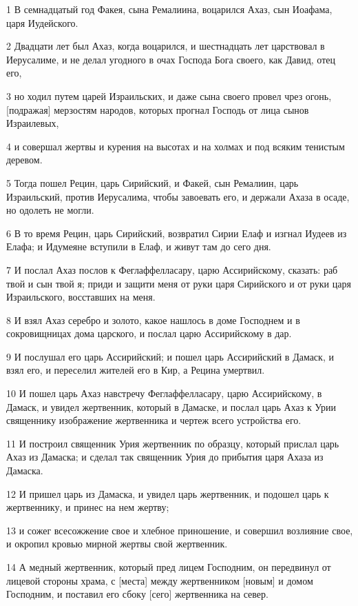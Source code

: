 \par 1 В семнадцатый год Факея, сына Ремалиина, воцарился Ахаз, сын Иоафама, царя Иудейского.
\par 2 Двадцати лет был Ахаз, когда воцарился, и шестнадцать лет царствовал в Иерусалиме, и не делал угодного в очах Господа Бога своего, как Давид, отец его,
\par 3 но ходил путем царей Израильских, и даже сына своего провел чрез огонь, [подражая] мерзостям народов, которых прогнал Господь от лица сынов Израилевых,
\par 4 и совершал жертвы и курения на высотах и на холмах и под всяким тенистым деревом.
\par 5 Тогда пошел Рецин, царь Сирийский, и Факей, сын Ремалиин, царь Израильский, против Иерусалима, чтобы завоевать его, и держали Ахаза в осаде, но одолеть не могли.
\par 6 В то время Рецин, царь Сирийский, возвратил Сирии Елаф и изгнал Иудеев из Елафа; и Идумеяне вступили в Елаф, и живут там до сего дня.
\par 7 И послал Ахаз послов к Феглаффелласару, царю Ассирийскому, сказать: раб твой и сын твой я; приди и защити меня от руки царя Сирийского и от руки царя Израильского, восставших на меня.
\par 8 И взял Ахаз серебро и золото, какое нашлось в доме Господнем и в сокровищницах дома царского, и послал царю Ассирийскому в дар.
\par 9 И послушал его царь Ассирийский; и пошел царь Ассирийский в Дамаск, и взял его, и переселил жителей его в Кир, а Рецина умертвил.
\par 10 И пошел царь Ахаз навстречу Феглаффелласару, царю Ассирийскому, в Дамаск, и увидел жертвенник, который в Дамаске, и послал царь Ахаз к Урии священнику изображение жертвенника и чертеж всего устройства его.
\par 11 И построил священник Урия жертвенник по образцу, который прислал царь Ахаз из Дамаска; и сделал так священник Урия до прибытия царя Ахаза из Дамаска.
\par 12 И пришел царь из Дамаска, и увидел царь жертвенник, и подошел царь к жертвеннику, и принес на нем жертву;
\par 13 и сожег всесожжение свое и хлебное приношение, и совершил возлияние свое, и окропил кровью мирной жертвы свой жертвенник.
\par 14 А медный жертвенник, который пред лицем Господним, он передвинул от лицевой стороны храма, с [места] между жертвенником [новым] и домом Господним, и поставил его сбоку [сего] жертвенника на север.

